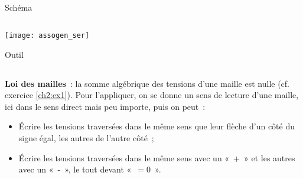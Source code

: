\documentclass[a4paper, 12pt, final, garamond]{book}
\begin{document}
\begin{tcbraster}[raster columns=5, raster equal height=rows]
    \begin{NCdefi}[raster multicolumn=2]{Schéma}
        \subsection{}\vspace*{-20pt}
        \begin{center}
            \texttt{[image: assogen\_ser]}
        \end{center}
    \end{NCdefi}
    \begin{NCrapp}[raster multicolumn=3]{Outil}
        \subsection{}
        \textbf{Loi des mailles}~: la somme algébrique des tensions d'une maille
        est nulle (cf. exercice \ref{ch2:ex1}). Pour l'appliquer, on se donne un
        sens de lecture d'une maille, ici dans le sens direct mais peu importe,
        puis on peut~:
        \begin{itemize}
            \item Écrire les tensions traversées dans le même sens que leur
                flèche d'un côté du signe égal, les autres de l'autre côté~;
            \item Écrire les tensions traversées dans le même sens avec un «~+~»
                et les autres avec un «~-~», le tout devant «~$=0$~».
        \end{itemize}
    \end{NCrapp}
\end{tcbraster}
\end{document}
